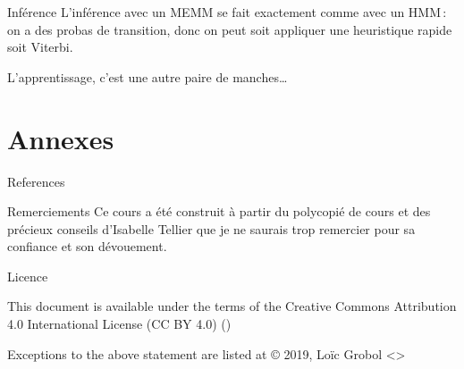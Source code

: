 \documentclass[hyperref={unicode}, xcolor={svgnames}, french]{beamer}
\begin{document}
\begin{frame}{Inférence}
	L'inférence avec un MEMM se fait exactement comme avec un HMM : on a des probas de transition, donc on peut soit appliquer une heuristique rapide soit Viterbi.

	L'apprentissage, c'est une autre paire de manches…
\end{frame}



\appendix
{}  %
\section{Annexes}
\begin{frame}[allowframebreaks]{References}
    \printbibliography[heading=none]
\end{frame}

\begin{frame}{Remerciements}
    Ce cours a été construit à partir du polycopié de cours  \parencite{tellier2017IntroductionFouilleTextes} et des précieux conseils d'Isabelle Tellier que je ne saurais trop remercier pour sa confiance et son dévouement.
\end{frame}

\begin{frame}{Licence}
    \begin{center}
        {\huge \ccby}
        \vfill
        This document is available under the terms of the Creative Commons Attribution 4.0 International License (CC BY 4.0) ()

        Exceptions to the above statement are listed at {\small{}}
        \vfill
        © 2019, Loïc Grobol <>

    \end{center}
\end{frame}
\end{document}
